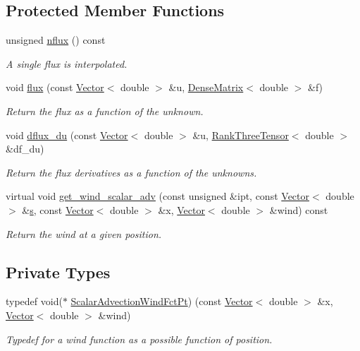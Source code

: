 \subsection*{Protected Member Functions}
\begin{DoxyCompactItemize}
\item 
unsigned \hyperlink{classoomph_1_1ScalarAdvectionEquations_adb45110daf7b47f7a2091448765b6f06}{nflux} () const
\begin{DoxyCompactList}\small\item\em A single flux is interpolated. \end{DoxyCompactList}\item 
void \hyperlink{classoomph_1_1ScalarAdvectionEquations_af5a06cfaa7bff5d831b739545a57580f}{flux} (const \hyperlink{classoomph_1_1Vector}{Vector}$<$ double $>$ \&u, \hyperlink{classoomph_1_1DenseMatrix}{Dense\+Matrix}$<$ double $>$ \&f)
\begin{DoxyCompactList}\small\item\em Return the flux as a function of the unknown. \end{DoxyCompactList}\item 
void \hyperlink{classoomph_1_1ScalarAdvectionEquations_af0073678c951417d6497ea0c772b30dc}{dflux\+\_\+du} (const \hyperlink{classoomph_1_1Vector}{Vector}$<$ double $>$ \&u, \hyperlink{classoomph_1_1RankThreeTensor}{Rank\+Three\+Tensor}$<$ double $>$ \&df\+\_\+du)
\begin{DoxyCompactList}\small\item\em Return the flux derivatives as a function of the unknowns. \end{DoxyCompactList}\item 
virtual void \hyperlink{classoomph_1_1ScalarAdvectionEquations_ae3a022b75a6f2c343c18a938ee3fb457}{get\+\_\+wind\+\_\+scalar\+\_\+adv} (const unsigned \&ipt, const \hyperlink{classoomph_1_1Vector}{Vector}$<$ double $>$ \&\hyperlink{cfortran_8h_ab7123126e4885ef647dd9c6e3807a21c}{s}, const \hyperlink{classoomph_1_1Vector}{Vector}$<$ double $>$ \&x, \hyperlink{classoomph_1_1Vector}{Vector}$<$ double $>$ \&wind) const
\begin{DoxyCompactList}\small\item\em Return the wind at a given position. \end{DoxyCompactList}\end{DoxyCompactItemize}
\subsection*{Private Types}
\begin{DoxyCompactItemize}
\item 
typedef void($\ast$ \hyperlink{classoomph_1_1ScalarAdvectionEquations_af80d315e76fe7392744d5442f1d2386d}{Scalar\+Advection\+Wind\+Fct\+Pt}) (const \hyperlink{classoomph_1_1Vector}{Vector}$<$ double $>$ \&x, \hyperlink{classoomph_1_1Vector}{Vector}$<$ double $>$ \&wind)
\begin{DoxyCompactList}\small\item\em Typedef for a wind function as a possible function of position. \end{DoxyCompactList}\end{DoxyCompactItemize}
